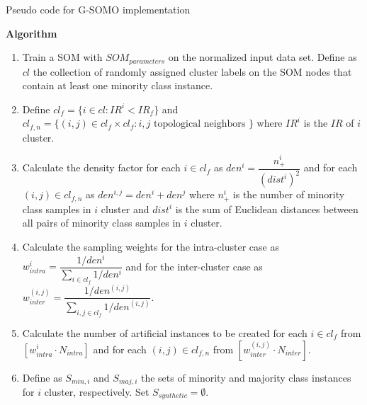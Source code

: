 \documentclass[parskip=full]{scrartcl}
\begin{document}
\begin{algorithm}[H]

	\SetAlgoLined
	\caption{Pseudo code for G-SOMO implementation}

	\BlankLine



	\BlankLine

	\textbf{Algorithm}
	\SetAlgoLined

	\begin{enumerate}

		\item Train a SOM with $SOM_{parameters}$ on the normalized input data set. Define as $cl$ the collection of randomly assigned cluster labels on the SOM nodes that contain at least one minority class instance.

		\item Define $cl_{f} =\{i \in cl: IR^{i} < IR_{f} \} $ and $cl_{f, n} =\{(i, j) \in cl_{f} \times cl_{f}: i, j \text{ topological neighbors } \} $ where $IR^{i}$ is the $IR$ of  $i$ cluster.

		\item Calculate the density factor for each $i \in cl_{f}$  as $den^{i}= \dfrac{n^{i}_{+}}{(dist^{i})^2}$ and for each $(i, j) \in cl_{f, n}$ as $den^{i, j} = den^{i} + den^{j}$ where $n^{i}_{+}$ is the number of minority class samples in $i$ cluster and $dist^{i}$ is the sum of Euclidean distances between all pairs  of minority class samples in $i$ cluster.

		\item Calculate the sampling weights for the intra-cluster case as $w^{i}_{intra} = \dfrac{1 / den^{i}}{\sum_{i \in cl_{f}} 1/den^{i}}$ and for the inter-cluster case as $w^{(i, j)}_{inter} = \dfrac{1 / den^{(i, j)}}{\sum_{i,j \in cl_{f}} 1/den^{(i,j)}}$.

		\item Calculate the number of artificial instances to be created for each $i \in cl_{f}$ from $[w^{i}_{intra} \cdot N_{intra}]$ and for each $(i, j) \in cl_{f, n}$ from $[w^{(i, j)}_{inter} \cdot N_{inter}]$.

		\item Define as $S_{min, i}$ and $S_{maj, i}$ the sets of minority and majority class instances for $i$ cluster, respectively. Set $S_{synthetic} = \emptyset$.


\end{enumerate}
\end{algorithm}
\end{document}
